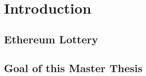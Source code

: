 \chapter{Introduction}\label{chap:intro}
\chapterstart


\section{Ethereum Lottery}\label{sec:ethlotto}


\section{Goal of this Master Thesis}\label{sec:goal}


\chapterend

